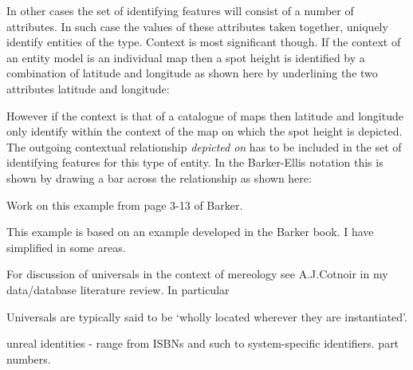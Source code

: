 \mynote In other cases the set of identifying features will consist of a number of attributes. In such case  the values of these attributes taken together, uniquely identify entities of the type. Context is most significant though. 
If the context of an entity model is an individual map then a spot height is identified by a combination of latitude and longitude as shown here by underlining the two attributes latitude and longitude: 

\begin{center}

\end{center}

However if the context is that of a catalogue of maps then latitude and longitude only identify within the context of the map on which the spot height is depicted. The outgoing contextual relationship \textit{depicted on}
has to be included in the set of identifying features for this type of entity. In the Barker-Ellis notation this is shown by drawing a bar across the relationship as shown here:  

\begin{center}

\end{center}

\mynote Work on this example from page 3-13 of Barker.

{This example is based on an example developed in the Barker book. I have simplified in some areas.}


\begin{noteforfuture}
For discussion of universals in  the context of mereology see A.J.Cotnoir in my data/database literature review. In particular
\begin{erquote}
Universals are typically said to be ‘wholly located wherever they are instantiated’.
\end{erquote}
\end{noteforfuture}

\begin{noteforfuture}
unreal identities - range from ISBNs and such to system-specific identifiers. part numbers.
\end{noteforfuture}



 
